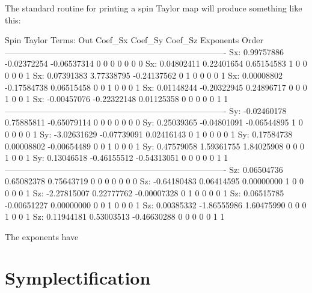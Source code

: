 The standard \bmad routine for printing a spin Taylor map will produce
something like this:
\begin{example}
  Spin Taylor Terms:
  Out      Coef_Sx         Coef_Sy         Coef_Sz      Exponents           Order
  -------------------------------------------------------------------------------
  Sx:      0.99757886     -0.02372254     -0.06537314   0  0  0  0  0  0        0
  Sx:      0.04802411      0.22401654      0.65154583   1  0  0  0  0  0        1
  Sx:      0.07391383      3.77338795     -0.24137562   0  1  0  0  0  0        1
  Sx:      0.00008802     -0.17584738      0.06515458   0  0  1  0  0  0        1
  Sx:      0.01148244     -0.20322945      0.24896717   0  0  0  1  0  0        1
  Sx:     -0.00457076     -0.22322148      0.01125358   0  0  0  0  0  1        1
  -------------------------------------------------------------------------------
  Sy:     -0.02460178      0.75885811     -0.65079114   0  0  0  0  0  0        0
  Sy:      0.25039365     -0.04801091     -0.06544895   1  0  0  0  0  0        1
  Sy:     -3.02631629     -0.07739091      0.02416143   0  1  0  0  0  0        1
  Sy:      0.17584738      0.00008802     -0.00654489   0  0  1  0  0  0        1
  Sy:      0.47579058      1.59361755      1.84025908   0  0  0  1  0  0        1
  Sy:      0.13046518     -0.46155512     -0.54313051   0  0  0  0  0  1        1
  -------------------------------------------------------------------------------
  Sz:      0.06504736      0.65082378      0.75643719   0  0  0  0  0  0        0
  Sz:     -0.64180483      0.06414595      0.00000000   1  0  0  0  0  0        1
  Sz:     -2.27815007      0.22777762     -0.00007328   0  1  0  0  0  0        1
  Sz:      0.06515785     -0.00651227      0.00000000   0  0  1  0  0  0        1
  Sz:      0.00385332     -1.86555986      1.60475990   0  0  0  1  0  0        1
  Sz:      0.11944181      0.53003513     -0.46630288   0  0  0  0  0  1        1
\end{example}
The exponents have 

\section{Symplectification}
\label{s:symp.method}

